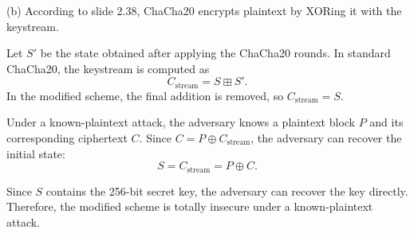 \begin{loigiai}
\bigskip

(b) According to slide 2.38, ChaCha20 encrypts plaintext
by XORing it with the keystream.

Let $S'$ be the state obtained after applying the ChaCha20 rounds.
In standard ChaCha20, the keystream is computed as
\[
C_{\mathrm{stream}} = S \boxplus S'.
\]
In the modified scheme, the final addition is removed, so
$C_{\mathrm{stream}} = S.$

Under a known-plaintext attack, the adversary knows a plaintext
block $P$ and its corresponding ciphertext $C$. Since
$C = P \oplus C_{\mathrm{stream}}$, the adversary can recover
the initial state:
\[
S = C_{\mathrm{stream}} = P \oplus C.
\]

Since $S$ contains the 256-bit secret key, the adversary can
recover the key directly. Therefore, the modified scheme is
totally insecure under a known-plaintext attack.
\end{loigiai}
